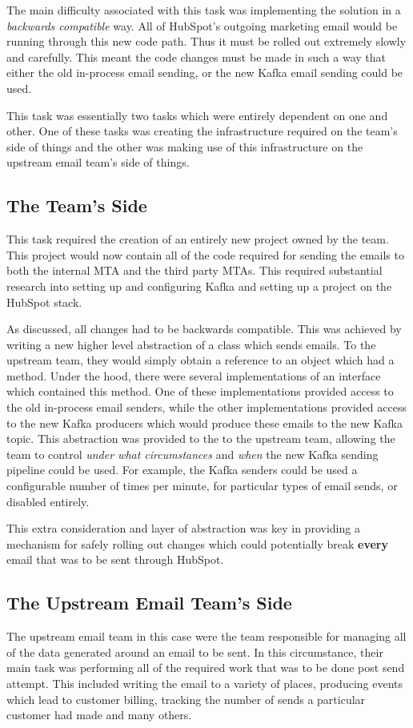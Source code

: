 The main difficulty associated with this task was implementing the solution in a \textit{backwards compatible} way. All of HubSpot's outgoing marketing email would be running through this new code path. Thus it must be rolled out extremely slowly and carefully. This meant the code changes must be made in such a way that either the old in-process email sending, or the new Kafka email sending could be used. 

This task was essentially two tasks which were entirely dependent on one and other. One of these tasks was creating the infrastructure required on the \team{} team's side of things and the other was making use of this infrastructure on the upstream email team's side of things.
\break

\subsection{The \team{} Team's Side}
This task required the creation of an entirely new project owned by the \team{} team. This project would now contain all of the code required for sending the emails to both the internal MTA and the third party MTAs. This required substantial research into setting up and configuring Kafka and setting up a project on the HubSpot stack. 

As discussed, all changes had to be backwards compatible. This was achieved by writing a new higher level abstraction of a class which sends emails. To the upstream team, they would simply obtain a reference to an object which had a  method. Under the hood, there were several implementations of an interface which contained this method. One of these implementations provided access to the old in-process email senders, while the other implementations provided access to the new Kafka producers which would produce these emails to the new Kafka topic. This abstraction was provided to the to the upstream team, allowing the \team{} team to control \textit{under what circumstances} and \textit{when} the new Kafka sending pipeline could be used. For example, the Kafka senders could be used a configurable number of times per minute, for particular types of email sends, or disabled entirely.

This extra consideration and layer of abstraction was key in providing a mechanism for safely rolling out changes which could potentially break \textbf{every} email that was to be sent through HubSpot.

\subsection{The Upstream Email Team's Side}
The upstream email team in this case were the team responsible for managing all of the data generated around an email to be sent. In this circumstance, their main task was performing all of the required work that was to be done post send attempt. This included writing the email to a variety of places, producing events which lead to customer billing, tracking the number of sends a particular customer had made and many others. 

